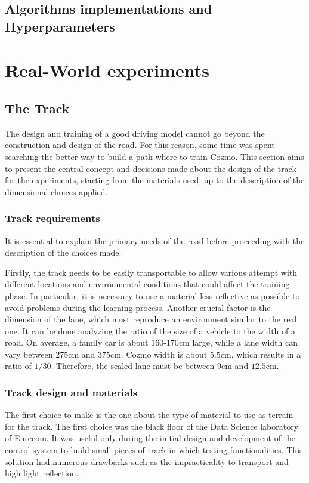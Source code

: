\subsection{Algorithms implementations and Hyperparameters}


\section{Real-World experiments}

\subsection{The Track}

The design and training of a good driving model cannot go beyond the construction and design of the road.
For this reason, some time was spent searching the better way to build a path where to train Cozmo.
This section aims to present the central concept and decisions made about the design of the track for the experiments, starting from the materials used, up to the description of the dimensional choices applied.

\subsubsection{Track requirements}

It is essential to explain the primary needs of the road before proceeding with the description of the choices made.

Firstly, the track needs to be easily transportable to allow various attempt with different locations and environmental conditions that could affect the training phase.
In particular, it is necessary to use a material less reflective as possible to avoid problems during the learning process.
Another crucial factor is the dimension of the lane, which must reproduce an environment similar to the real one.
It can be done analyzing the ratio of the size of a vehicle to the width of a road.
On average, a family car is about $160$-$170$cm large, while a lane width can vary between $275$cm and $375$cm.
Cozmo width is about $5.5$cm, which results in a ratio of $1/30$.
Therefore, the scaled lane must be between $9$cm and $12.5$cm.

\subsubsection{Track design and materials}

The first choice to make is the one about the type of material to use as terrain for the track.
The first choice was the black floor of the Data Science laboratory of Eurecom.
It was useful only during the initial design and development of the control system to build small pieces of track in which testing functionalities.
This solution had numerous drawbacks such as the impracticality to transport and high light reflection.


